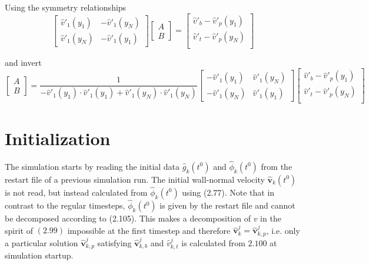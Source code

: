 \documentclass[titlepage,12pt,letter]{article}
\numberwithin{equation}{section}
\begin{document}
Using the symmetry relationships
\begin{equation*}
	\renewcommand{\arraystretch}{2}
	\begin{bmatrix}
		\hat{v}'_1\left(y_{1}\right) & -\hat{v}'_1\left(y_{N}\right) \\
		\hat{v}'_1\left(y_{N}\right) & -\hat{v}'_1\left(y_{1}\right)
	\end{bmatrix}
	\begin{bmatrix}
		A\\ B
	\end{bmatrix}
	=
	\begin{bmatrix}
		\hat{v}'_b-\hat{v}'_p\left(y_{1}\right) \\
		\hat{v}'_t-\hat{v}'_p\left(y_{N}\right) \\
	\end{bmatrix}
\end{equation*}

and invert
\begin{equation}
	\renewcommand{\arraystretch}{2}
	\begin{bmatrix}
		A\\ B
	\end{bmatrix}
	=\frac{1}{-\hat{v}'_1(y_1)\cdot \hat{v}'_1(y_1)+ \hat{v}'_1(y_N)\cdot \hat{v}'_1(y_N)}
	\begin{bmatrix}
		-\hat{v}'_1\left(y_{1}\right)& \hat{v}'_1\left(y_{N}\right) \\
		-\hat{v}'_1\left(y_{N}\right) &	\hat{v}'_1\left(y_{1}\right) 
	\end{bmatrix}
	\begin{bmatrix}
	\hat{v}'_b-\hat{v}'_p\left(y_{1}\right) \\
	\hat{v}'_t-\hat{v}'_p\left(y_{N}\right) \\
\end{bmatrix}
\end{equation}


\section{Initialization}

The simulation starts by reading the initial data $\hat{g}_{k}\left(t^{0}\right)$ and $\hat{\phi}_{k}\left(t^{0}\right)$ from the restart file of a previous simulation run. The initial wall-normal velocity $\hat{\bm{v}}_{k}\left(t^{0}\right)$ is not read, but instead calculated from $\hat{\phi}_{k}\left(t^{0}\right)$ using (2.77). Note that in contrast to the regular timesteps, $\hat{\phi}_{k}\left(t^{0}\right)$ is given by the restart file and cannot be decomposed according to (2.105). This makes a decomposition of $v$ in the spirit of $(2.99)$ impossible at the first timestep and therefore $\hat{\bm{v}}_{k}^{j}=\hat{\bm{v}}_{k, p}^{j}$, i.e. only a particular solution $\hat{\bm{v}}_{k, p}^{j}$ satisfying $\hat{\bm{v}}_{k, b}^{j}$ and $\hat{v}_{k, t}^{j}$ is calculated from $2.100$ at simulation startup.
\end{document}

